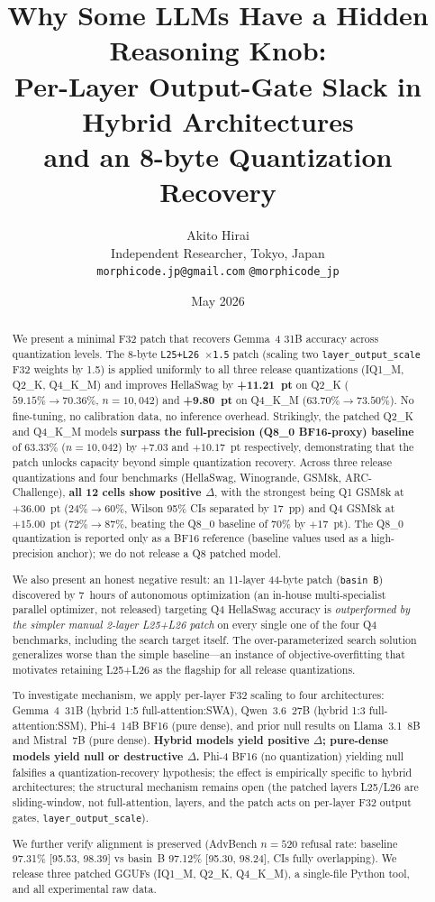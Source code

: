 \documentclass[11pt]{article}
\title{Why Some LLMs Have a Hidden Reasoning Knob: \\
Per-Layer Output-Gate Slack in Hybrid Architectures \\
and an 8-byte Quantization Recovery}
\author{
  Akito Hirai \\
  Independent Researcher, Tokyo, Japan \\
  \texttt{morphicode.jp@gmail.com} \quad \texttt{@morphicode\_jp}
}
\date{May 2026}
\begin{document}
\maketitle

\begin{abstract}
We present a minimal F32 patch that recovers Gemma~4 31B accuracy across
quantization levels. The 8-byte \texttt{L25{+}L26 $\times$1.5} patch
(scaling two \texttt{layer\_output\_scale} F32 weights by 1.5) is applied
uniformly to all three release quantizations (IQ1\_M, Q2\_K, Q4\_K\_M)
and improves HellaSwag by \textbf{+11.21~pt} on Q2\_K
($59.15\% \to 70.36\%$, $n{=}10{,}042$) and \textbf{+9.80~pt} on
Q4\_K\_M ($63.70\% \to 73.50\%$). No fine-tuning, no calibration
data, no inference overhead. Strikingly, the patched Q2\_K and Q4\_K\_M
models \textbf{surpass the full-precision (Q8\_0 BF16-proxy) baseline} of
$63.33\%$ ($n{=}10{,}042$) by $+7.03$ and $+10.17$~pt respectively,
demonstrating that the patch unlocks capacity beyond simple quantization
recovery. Across three release quantizations and four benchmarks
(HellaSwag, Winogrande, GSM8k, ARC-Challenge), \textbf{all 12 cells show
positive $\Delta$}, with the strongest being Q1 GSM8k at $+36.00$~pt
($24\% \to 60\%$, Wilson 95\% CIs separated by 17~pp) and Q4 GSM8k at
$+15.00$~pt ($72\% \to 87\%$, beating the Q8\_0 baseline of $70\%$ by
$+17$~pt). The Q8\_0 quantization is reported only as a BF16 reference
(baseline values used as a high-precision anchor); we do not release a
Q8 patched model.

We also present an honest negative result: an 11-layer 44-byte patch
(\texttt{basin~B}) discovered by 7~hours of autonomous optimization
(an in-house multi-specialist parallel optimizer, not released) targeting Q4 HellaSwag accuracy is
\emph{outperformed by the simpler manual 2-layer L25+L26 patch} on every
single one of the four Q4 benchmarks, including the search target itself.
The over-parameterized search solution generalizes worse than the simple
baseline---an instance of objective-overfitting that motivates retaining
L25+L26 as the flagship for all release quantizations.

To investigate mechanism, we apply per-layer F32 scaling to four architectures:
Gemma~4~31B (hybrid 1:5 full-attention:SWA), Qwen~3.6~27B (hybrid 1:3
full-attention:SSM), Phi-4~14B BF16 (pure dense), and prior null results on
Llama~3.1~8B and Mistral~7B (pure dense). \textbf{Hybrid models yield positive
$\Delta$; pure-dense models yield null or destructive $\Delta$.} Phi-4 BF16
(no quantization) yielding null falsifies a quantization-recovery hypothesis;
the effect is empirically specific to hybrid architectures; the structural mechanism remains open (the patched layers L25/L26 are sliding-window, not full-attention, layers, and the patch acts on per-layer F32 output gates, \texttt{layer\_output\_scale}).

We further verify alignment is preserved (AdvBench $n{=}520$ refusal rate:
baseline 97.31\% [95.53, 98.39] vs basin~B 97.12\% [95.30, 98.24], CIs fully
overlapping). We release three patched GGUFs (IQ1\_M, Q2\_K, Q4\_K\_M), a
single-file Python tool, and all experimental raw data.
\end{abstract}
\end{document}

